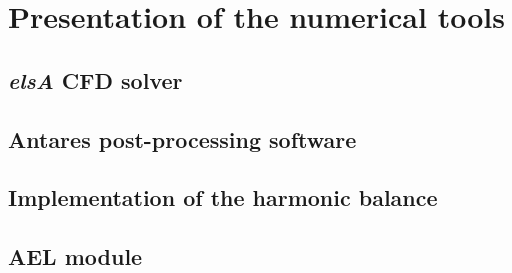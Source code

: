 \chapter{Presentation of the numerical tools}
\label{cha:numericals}

\chabstract{}

\minitoc
\newpage

\section{\emph{elsA} CFD solver}
\label{sec:num_elsa}


\section{Antares post-processing software}
\label{sec:num_antares}


\section{Implementation of the harmonic balance}
\label{sec:num_hb}


\section{AEL module}
\label{sec:num_ael}


\chconclu{}
